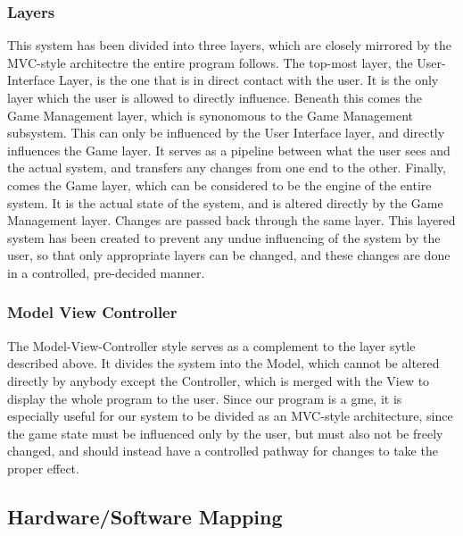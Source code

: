 \documentclass[12pt]{article} %
\begin{document}
\subsubsection{Layers} %

This system has been divided into three layers, which are closely mirrored by the MVC-style architectre the entire program follows. The top-most layer, the User-Interface Layer, is the one that is in direct contact with the user. It is the only layer which the user is allowed to directly influence. Beneath this comes the Game Management layer, which is synonomous to the Game Management subsystem. This can only be influenced by the User Interface layer, and directly influences the Game layer. It serves as a pipeline between what the user sees and the actual system, and transfers any changes from one end to the other. Finally, comes the Game layer, which can be considered to be the engine of the entire system. It is the actual state of the system, and is altered directly by the Game Management layer. Changes are passed back through the same layer. This layered system has been created to prevent any undue influencing of the system by the user, so that only appropriate layers can be changed, and these changes are done in a controlled, pre-decided manner.


\subsubsection{Model View Controller} %

The Model-View-Controller style serves as a complement to the layer sytle described above. It divides the system into the Model, which cannot be altered directly by anybody except the Controller, which is merged with the View to display the whole program to the user. Since our program is a gme, it is especially useful for our system to be divided as an MVC-style architecture, since the game state must be influenced only by the user, but must also not be freely changed, and should instead have a controlled pathway for changes to take the proper effect.


\subsection{Hardware/Software Mapping} %
\end{document}
